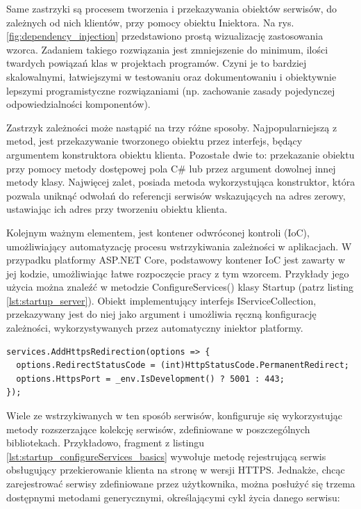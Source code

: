 Same zastrzyki są procesem tworzenia i przekazywania obiektów serwisów, do zależnych od nich klientów, przy pomocy obiektu Iniektora. Na rys. \ref{fig:dependency_injection} przedstawiono prostą wizualizację zastosowania wzorca. Zadaniem takiego rozwiązania jest zmniejszenie do minimum, ilości twardych powiązań klas w projektach programów. Czyni je to bardziej skalowalnymi, łatwiejszymi w testowaniu oraz dokumentowaniu i obiektywnie lepszymi programistyczne rozwiązaniami (np. zachowanie zasady pojedynczej odpowiedzialności komponentów).

Zastrzyk zależności może nastąpić na trzy różne sposoby. Najpopularniejszą z metod, jest przekazywanie tworzonego obiektu przez interfejs, będący argumentem konstruktora obiektu klienta. Pozostałe dwie to: przekazanie obiektu przy pomocy metody dostępowej pola C\# lub przez argument dowolnej innej metody klasy. Najwięcej zalet, posiada metoda wykorzystująca konstruktor, która pozwala uniknąć odwołań do referencji serwisów wskazujących na adres zerowy, ustawiając ich adres przy tworzeniu obiektu klienta.

Kolejnym ważnym elementem, jest kontener odwróconej kontroli (IoC), umożliwiający automatyzację procesu wstrzykiwania zależności w aplikacjach. W przypadku platformy ASP.NET Core, podstawowy kontener IoC jest zawarty w jej kodzie, umożliwiając łatwe rozpoczęcie pracy z tym wzorcem. Przykłady jego użycia można znaleźć w metodzie ConfigureServices() klasy Startup (patrz listing \ref{lst:startup_server}). Obiekt implementujący interfejs IServiceCollection, przekazywany jest do niej jako argument i umożliwia ręczną konfigurację zależności, wykorzystywanych przez automatyczny iniektor platformy.

\begin{lstlisting}[language=CSharp, caption=Fragment ciała metody Startup.ConfigureServices() poświęcony konfiguracji przekierowania do strony w wersji HTTPS, label=lst:startup_configureServices_basics]
services.AddHttpsRedirection(options => {
  options.RedirectStatusCode = (int)HttpStatusCode.PermanentRedirect;
  options.HttpsPort = _env.IsDevelopment() ? 5001 : 443;
});
\end{lstlisting}

Wiele ze wstrzykiwanych w ten sposób serwisów, konfiguruje się wykorzystując metody rozszerzające kolekcję serwisów, zdefiniowane w poszczególnych bibliotekach. Przykładowo, fragment z listingu \ref{lst:startup_configureServices_basics} wywołuje metodę rejestrującą serwis obsługujący przekierowanie klienta na stronę w wersji HTTPS. Jednakże, chcąc zarejestrować serwisy zdefiniowane przez użytkownika, można posłużyć się trzema dostępnymi metodami generycznymi, określającymi cykl życia danego serwisu:


